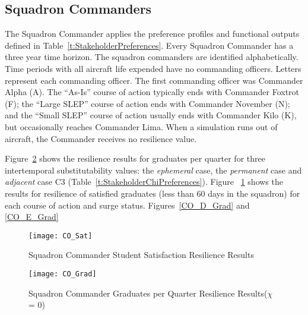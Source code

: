 \subsection{Squadron Commanders}

The Squadron Commander applies the preference profiles and functional
outputs defined in Table~\ref{t:StakeholderPreferences}. Every
Squadron Commander has a three year time horizon. The squadron commanders are
identified alphabetically. Time periods with all aircraft life
expended have no commanding officers. Letters represent each
commanding officer. The first commanding officer was 
Commander Alpha (A). The ``As-Is'' course of action typically ends
with Commander Foxtrot (F); the ``Large SLEP'' course of action ends
with Commander November (N); and the ``Small SLEP'' course of action
usually ends with Commander Kilo (K), but occasionally reaches
Commander Lima. When a simulation runs out of aircraft, the Commander
receives no resilience value.

Figure~\ref{f:CO_Grad} shows the resilience
results for graduates per quarter for three intertemporal
substitutability values: the \emph{ephemeral} case, the
\emph{permanent} case and  \emph{adjacent} case C3
(Table~\ref{t:StakeholderChiPreferences}). Figure ~\ref{f:CO_Sat} shows the results for
resilience of satisfied graduates (less than 60 days in the squadron)
for each course of action and surge status. Figures~\ref{CO_D_Grad}
and \ref{CO_E_Grad}
\begin{figure}[h]
  \centering\texttt{[image: CO\_Sat]}
  \caption{Squadron Commander Student Satisfaction Resilience Results}
  \label{f:CO_Sat}
\end{figure}

\begin{figure}[h]
  \centering\texttt{[image: CO\_Grad]}
  \caption{Squadron Commander Graduates per Quarter Resilience
    Results($\chi$ = 0)}
  \label{f:CO_Grad}
\end{figure}



